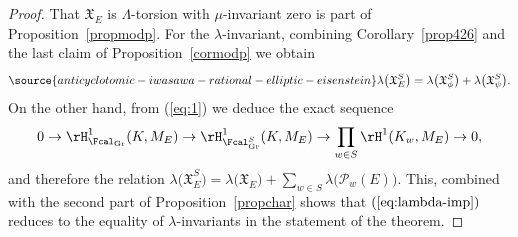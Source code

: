 \begin{proof}
That $\mathfrak{X}_E$ is $\Lambda$-torsion with $\mu$-invariant zero is part of Proposition~\ref{propmodp}. For the $\lambda$-invariant, combining Corollary~\ref{prop426} and the last claim of Proposition~\ref{cormodp} we obtain
\begin{equation}\label{eq:lambda-imp}
\source{anticyclotomic-iwasawa-rational-elliptic-eisenstein}
\lambda\bigl(\mathfrak{X}_E^S\bigr)
=\lambda\bigl(\mathfrak{X}_\phi^S\bigr)+\lambda\bigl(\mathfrak{X}_{\psi}^S\bigr).
\end{equation}
On the other hand, from (\ref{eq:1}) we deduce the exact sequence
\[
0 \rightarrow \rH^1_{\Fcal_{\rm Gr}}(K,M_E) \rightarrow \rH^1_{\Fcal_{\rm Gr}^S}(K,M_E) \rightarrow \prod_{w\in S}\rH^1(K_w,M_E) \rightarrow 0,
\]
and therefore the relation $\lambda\bigl(\mathfrak{X}_E^S\bigr)=\lambda\bigl(\mathfrak{X}_E\bigr)+\sum_{w\in S}\lambda\bigl(\mathcal{P}_w(E)\bigr)$. This, combined with the second part of Proposition~\ref{propchar} shows that $(\ref{eq:lambda-imp})$ reduces to the equality of $\lambda$-invariants in the statement
of the theorem.
\end{proof}
